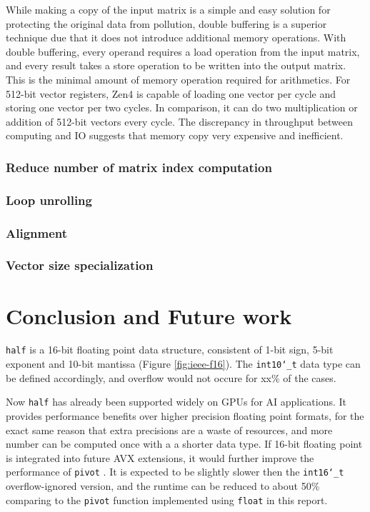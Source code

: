 \documentclass[logo,bsc,singlespacing,parskip]{infthesis}
\newcommand{\dthalfi}{\texttt{int10\char`_t} }
\newcommand{\dtshort}{\texttt{int16\char`_t} }
\newcommand{\dthalf}{\texttt{half} }
\newcommand{\dtfloat}{\texttt{float} }
\newcommand{\pivot}{\texttt{pivot} }
\begin{document}
While making a copy of the input matrix is a simple and easy solution for
protecting the original data from pollution, double buffering is a superior
technique due that it does not introduce additional memory operations. With
double buffering, every operand requires a load operation from the input matrix,
and every result takes a store operation to be written into the output matrix.
This is the minimal amount of memory operation required for arithmetics. For
512-bit vector registers, Zen4 is capable of loading one vector per cycle and
storing one vector per two cycles. In comparison, it can do two multiplication
or addition of 512-bit vectors every cycle. The discrepancy in throughput
between computing and IO suggests that memory copy very expensive and
inefficient. 

\subsection{Reduce number of matrix index computation}
\subsection{Loop unrolling}

\subsection{Alignment}

\subsection{Vector size specialization}




\label{sec:optmz-get-index}


\chapter{Conclusion and Future work}

\dthalf is a 16-bit floating point data structure, consistent of 1-bit sign,
5-bit exponent and 10-bit mantissa (Figure \ref{fig:ieee-f16}). The \dthalfi
data type can be defined accordingly, and overflow would not occure for xx\% of
the cases. 

Now \dthalf has already been supported widely on GPUs for AI applications. It
provides performance benefits over higher precision floating point formats, for
the exact same reason that extra precisions are a waste of resources, and more
number can be computed once with a a shorter data type. If 16-bit floating point
is integrated into future AVX extensions, it would further improve the
performance of \pivot. It is expected to be slightly slower then the \dtshort
overflow-ignored version, and the runtime can be reduced to about 50\% comparing
to the \pivot function implemented using \dtfloat in this report.
\end{document}
